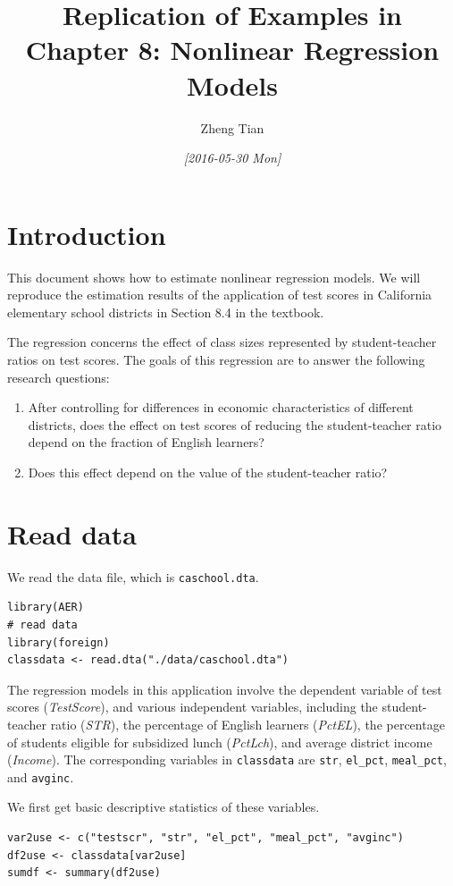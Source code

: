 \documentclass[11pt]{article}
\author{Zheng Tian}
\date{\textit{[2016-05-30 Mon]}}
\title{Replication of Examples in Chapter 8: Nonlinear Regression Models}
\begin{document}
\maketitle


\section{Introduction}
\label{sec:orgd5b8937}

This document shows how to estimate nonlinear regression models. We
will reproduce the estimation results of the application of test
scores in California elementary school districts in Section 8.4 in the
textbook.

The regression concerns the effect of class sizes represented by
student-teacher ratios on test scores. The goals of this regression
are to answer the following research questions:
\begin{enumerate}
\item After controlling for differences in economic characteristics of
different districts, does the effect on test scores of reducing the
student-teacher ratio depend on the fraction of English learners?
\item Does this effect depend on the value of the student-teacher ratio?
\end{enumerate}

\section{Read data}
\label{sec:orga4903c1}

We read the data file, which is \texttt{caschool.dta}.
\begin{verbatim}
library(AER)
# read data
library(foreign)
classdata <- read.dta("./data/caschool.dta")
\end{verbatim}

The regression models in this application involve the dependent
variable of test scores (\emph{TestScore}), and various independent variables, including
the student-teacher ratio (\emph{STR}), the percentage of English learners
(\emph{PctEL}), the percentage of students eligible for subsidized lunch
(\emph{PctLch}), and average district income (\emph{Income}). The corresponding
variables in \texttt{classdata} are \texttt{str}, \texttt{el\_pct}, \texttt{meal\_pct}, and
\texttt{avginc}.

We first get basic descriptive statistics of these variables.
\begin{verbatim}
var2use <- c("testscr", "str", "el_pct", "meal_pct", "avginc")
df2use <- classdata[var2use]
sumdf <- summary(df2use)
\end{verbatim}
\end{document}
